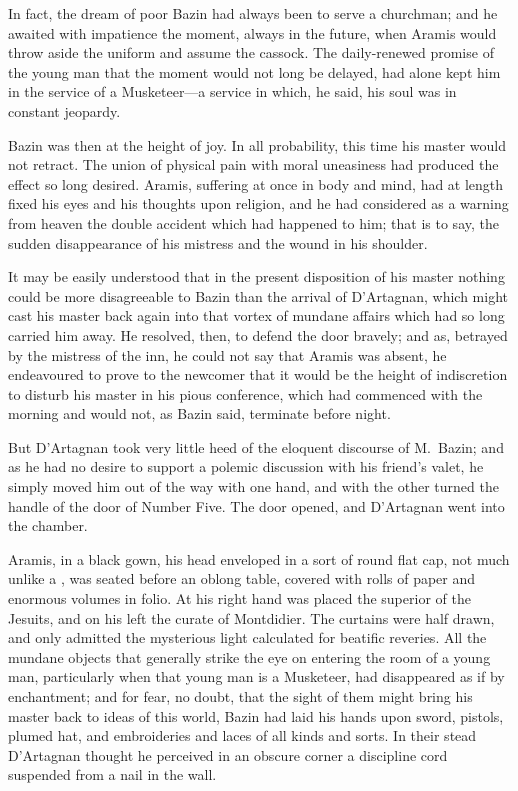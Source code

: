 In fact, the dream of poor Bazin had always been to serve a churchman; and he awaited with impatience the moment, always in the future, when Aramis would throw aside the uniform and assume the cassock. The daily-renewed promise of the young man that the moment would not long be delayed, had alone kept him in the service of a Musketeer—a service in which, he said, his soul was in constant jeopardy. 

Bazin was then at the height of joy. In all probability, this time his master would not retract. The union of physical pain with moral uneasiness had produced the effect so long desired. Aramis, suffering at once in body and mind, had at length fixed his eyes and his thoughts upon religion, and he had considered as a warning from heaven the double accident which had happened to him; that is to say, the sudden disappearance of his mistress and the wound in his shoulder. 

It may be easily understood that in the present disposition of his master nothing could be more disagreeable to Bazin than the arrival of D'Artagnan, which might cast his master back again into that vortex of mundane affairs which had so long carried him away. He resolved, then, to defend the door bravely; and as, betrayed by the mistress of the inn, he could not say that Aramis was absent, he endeavoured to prove to the newcomer that it would be the height of indiscretion to disturb his master in his pious conference, which had commenced with the morning and would not, as Bazin said, terminate before night. 

But D'Artagnan took very little heed of the eloquent discourse of M.~Bazin; and as he had no desire to support a polemic discussion with his friend's valet, he simply moved him out of the way with one hand, and with the other turned the handle of the door of Number Five. The door opened, and D'Artagnan went into the chamber. 

Aramis, in a black gown, his head enveloped in a sort of round flat cap, not much unlike a , was seated before an oblong table, covered with rolls of paper and enormous volumes in folio. At his right hand was placed the superior of the Jesuits, and on his left the curate of Montdidier. The curtains were half drawn, and only admitted the mysterious light calculated for beatific reveries. All the mundane objects that generally strike the eye on entering the room of a young man, particularly when that young man is a Musketeer, had disappeared as if by enchantment; and for fear, no doubt, that the sight of them might bring his master back to ideas of this world, Bazin had laid his hands upon sword, pistols, plumed hat, and embroideries and laces of all kinds and sorts. In their stead D'Artagnan thought he perceived in an obscure corner a discipline cord suspended from a nail in the wall. 

